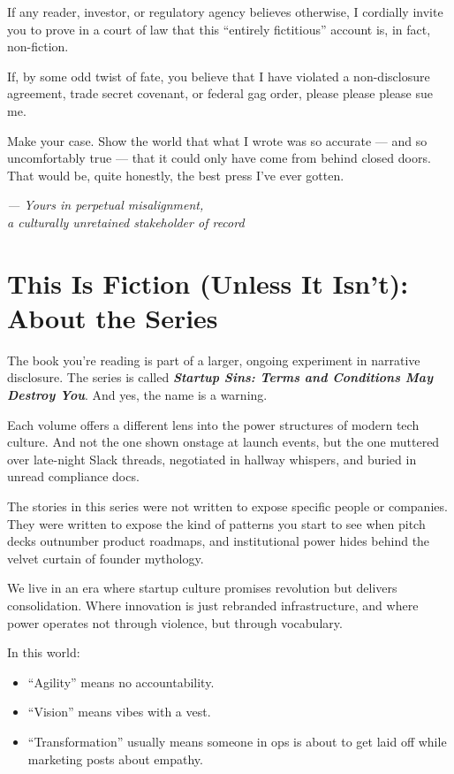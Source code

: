 \documentclass{article}
\begin{document}
  If any reader, investor, or regulatory agency believes otherwise, I cordially invite you to prove 
  in a court of law that this ``entirely fictitious'' account is, in fact, non-fiction.

  
  If, by some odd twist of fate, you believe that I have violated a non-disclosure agreement, 
  trade secret covenant, or federal gag order, please please please sue me.

  Make your case. Show the world that what I wrote was so accurate --- and so uncomfortably true --- 
  that it could only have come from behind closed doors. That would be, quite honestly, the best press 
  I’ve ever gotten.
  
  \begin{flushright}
    \textit{— Yours in perpetual misalignment,}\\
    \textit{a culturally unretained stakeholder of record}
    \end{flushright}

  \section*{This Is Fiction (Unless It Isn’t): About the Series}

  The book you're reading is part of a larger, ongoing experiment in narrative disclosure.  
  The series is called \textbf{\textit{Startup Sins: Terms and Conditions May Destroy You}}. And yes, 
  the name is a warning.
  
  Each volume offers a different lens into the power structures of modern tech culture. And not the 
  one shown onstage at launch events, but the one muttered over late-night Slack threads, negotiated in 
  hallway whispers, and buried in unread compliance docs.
  
  The stories in this series were not written to expose specific people or companies.  
  They were written to expose the kind of patterns you start to see when pitch decks outnumber 
  product roadmaps, and institutional power hides behind the velvet curtain of founder mythology.
  
  We live in an era where startup culture promises revolution but delivers consolidation.
  Where innovation is just rebranded infrastructure, and where power operates not through violence, 
  but through vocabulary.
  
  In this world:
  
  \begin{itemize}
    \item ``Agility'' means no accountability.
    \item ``Vision'' means vibes with a vest.
    \item ``Transformation'' usually means someone in ops is about to get laid off while marketing posts about empathy.
  \end{itemize}
  
\end{document}

